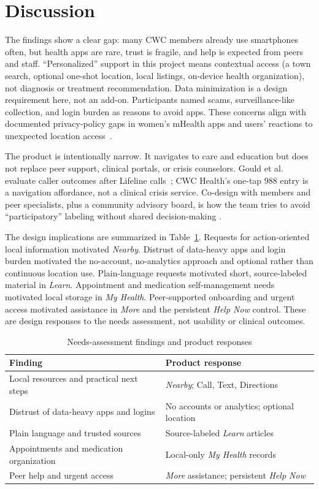 \documentclass[conference,a4paper]{IEEEtran}
\begin{document}
\section{Discussion}
The findings show a clear gap: many CWC members already use smartphones often, but
health apps are rare, trust is fragile, and help is expected from peers and
staff. ``Personalized'' support in this project means contextual access (a town
search, optional one-shot location, local listings, on-device health
organization), not diagnosis or treatment recommendation. Data minimization is a
design requirement here, not an add-on. Participants named scams,
surveillance-like collection, and login burden as reasons to avoid apps. These
concerns align with documented privacy-policy gaps in women's mHealth apps and
users' reactions to unexpected location
access~\cite{Alfawzan2022mHealthPrivacy,Almuhimedi2015LocationShared}.

The product is intentionally narrow. It navigates to care and education but does
not replace peer support, clinical portals, or crisis counselors. Gould et al.
evaluate caller outcomes after Lifeline calls~\cite{Gould2025Lifeline988}; CWC
Health's one-tap 988 entry is a navigation affordance, not a clinical crisis
service. Co-design with members and peer
specialists, plus a community advisory board, is how the team tries to avoid
``participatory'' labeling without shared decision-making
\cite{Veldmeijer2025Participatory,Epp2025CoLeadership}.

The design implications are summarized in Table~\ref{tab:theme_map}. Requests
for action-oriented local information motivated \emph{Nearby}. Distrust of
data-heavy apps and login burden motivated the no-account, no-analytics approach
and optional rather than continuous location use. Plain-language requests
motivated short, source-labeled material in \emph{Learn}. Appointment and
medication self-management needs motivated local storage in \emph{My Health}.
Peer-supported onboarding and urgent access motivated assistance in \emph{More}
and the persistent \emph{Help Now} control. These are design responses to the
needs assessment, not usability or clinical outcomes.

\begin{table}[!t]
\caption{Needs-assessment findings and product responses}
\label{tab:theme_map}
\centering
\begin{tabular}{@{}p{}p{}@{}}
\toprule
\textbf{Finding} & \textbf{Product response} \\
\midrule
Local resources and practical next steps & \emph{Nearby}; Call, Text, Directions \\
Distrust of data-heavy apps and logins & No accounts or analytics; optional location \\
Plain language and trusted sources & Source-labeled \emph{Learn} articles \\
Appointments and medication organization & Local-only \emph{My Health} records \\
Peer help and urgent access & \emph{More} assistance; persistent \emph{Help Now} \\
\bottomrule
\end{tabular}
\end{table}
\end{document}
